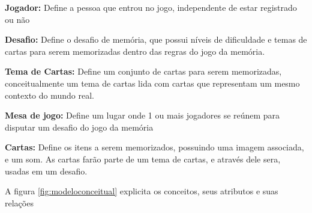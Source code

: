 \begin{alineascomponto}
  \item \textbf{Jogador:} Define a pessoa que entrou no jogo, independente de estar registrado ou não
  \item \textbf{Desafio:} Define o desafio de memória, que possui níveis de dificuldade e temas de cartas para serem memorizadas dentro das regras do jogo da memória.  
  \item \textbf{Tema de Cartas:} Define um conjunto de cartas para serem memorizadas, conceitualmente um tema de cartas lida com cartas que representam um mesmo contexto do mundo real.
  \item \textbf{Mesa de jogo:} Define um lugar onde 1 ou mais jogadores se reúnem para disputar um desafio do jogo da memória 
  \item \textbf{Cartas:}  Define os itens a serem memorizados, possuindo uma imagem associada, e um som. As cartas farão parte de um tema de cartas, e através dele sera, usadas em um desafio. 
\end{alineascomponto}


A figura \ref{fig:modeloconceitual} explicita os conceitos, seus atributos e suas relações


\begin{figure}[h!]
  \centering
\end{figure}






